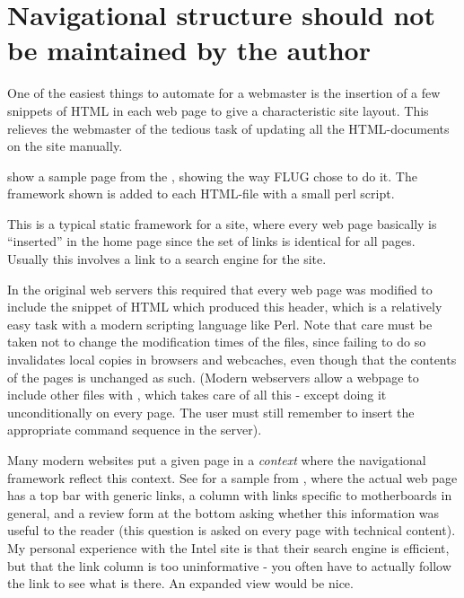 \section{Navigational structure should not be maintained by the author}


One of the easiest things to automate for a webmaster is the insertion
of a few snippets of HTML in each web page to give a characteristic
site layout.  This relieves the webmaster of the tedious task of
updating all the HTML-documents on the site manually.

 show a sample page from the
,
showing the way FLUG chose to do it.  The framework shown is added to
each HTML-file with a small perl script.

This is a typical static framework for a site, where every web page
basically is ``inserted'' in the home page since the set of links is
identical for all pages.  Usually this involves a link to a search
engine for the site.

In the original web servers this required that every web page was
modified to include the snippet of HTML which produced this header,
which is a relatively easy task with a modern scripting language like
Perl.  Note that care must be taken not to change the modification
times of the files, since failing to do so invalidates local copies in
browsers and webcaches, even though that the contents of the pages is
unchanged as such.  (Modern webservers allow a webpage to include
other files with
, which takes care of all this - except doing it
unconditionally on every page.  The user must still remember to insert
the appropriate command sequence in the server).

%
%
Many modern websites put a given page in a \textit{context} where the
navigational framework reflect this context.  See
 for a sample from
, where the actual web page has a
top bar with generic links, a column with links specific to
motherboards in general, and a review form at the bottom asking
whether this information was useful to the reader (this question is
asked on every page with technical content).  My personal experience
with the Intel site is that their search engine is efficient, but that
the link column is too uninformative - you often have to actually
follow the link to see what is there.  An expanded view would be nice.


